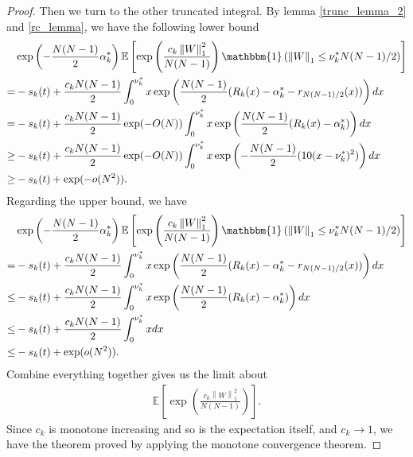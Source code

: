 \documentclass[10pt]{article}
\newcommand{\e}{\mathbb{E}}
\newcommand{\norm}[1]{\left\lVert#1\right\rVert}
\newenvironment{Proof of lemma}{\noindent{\bf Proof of Lemma}}{\hfill$\Box$\newline}
\newenvironment{Proof of claim}{\noindent{\bf Proof of claim}}{\hfill$\Box$\newline}
\newenvironment{Proof of theorem}{\noindent{\bf Proof of Theorem}}{\hfill\scriptsize{$\Box$}\newline}
\newenvironment{Proof of theorems}{\noindent{\bf Proof of Theorems}}{\hfill$\Box$\newline}
\newenvironment{Proof of proposition}{\noindent{\bf Proof of Proposition}}{\hfill$\Box$\newline}
\newenvironment{Proof of propositions}{\noindent{\bf Proof of Propositions}}{\hfill$\Box$\newline}
\newenvironment{Proof of exercise}{\noindent{\it Proof of Exercise:}}{\hfill$\Box$}
\numberwithin{equation}{section}
\begin{document}
\begin{proof}
Then we turn to the other truncated integral. By lemma \ref{trunc_lemma_2} and \ref{rc_lemma}, we have the following lower bound
\begin{align}
    &\exp\left(-\frac{N(N-1)}{2} \alpha_k^* \right)\e\left[ \exp \left(\frac{c_k\norm{W}^2_1}{N(N-1)}\right) \mathbbm{1}\left(\norm{W}_1 \leq \nu^*_k N(N-1)/2\right)\right] \nonumber \\
    =&-s_k(t) + \frac{c_kN(N-1)}{2}\int_{0}^{\nu^*_k}x \exp \left(\frac{N(N-1)}{2}(R_k(x)-\alpha_k^* -r_{N(N-1)/2}(x))\right)dx \nonumber \\
    =&-s_k(t) + \frac{c_kN(N-1)}{2}\exp(-O(N))\int_{0}^{\nu^*_k}x \exp \left(\frac{N(N-1)}{2}(R_k(x)-\alpha_k^*)\right)dx \nonumber \\
    \geq& -s_k(t) + \frac{c_kN(N-1)}{2}\exp(-O(N)) \int_{0}^{\nu^*_k}x \exp \left(-\frac{N(N-1)}{2}(10(x-\nu_k^*)^2)\right)dx \nonumber \\
    \geq& -s_k(t) + \exp(-o(N^2)).
\end{align}
Regarding the upper bound, we have
\begin{align}
    &\exp\left(-\frac{N(N-1)}{2} \alpha_k^* \right)\e\left[ \exp \left(\frac{c_k\norm{W}^2_1}{N(N-1)}\right) \mathbbm{1}\left(\norm{W}_1 \leq \nu^*_k N(N-1)/2\right)\right] \nonumber \\
    =&-s_k(t) + \frac{c_kN(N-1)}{2}\int_{0}^{\nu^*_k}x \exp \left(\frac{N(N-1)}{2}(R_k(x)-\alpha_k^* -r_{N(N-1)/2}(x))\right)dx \nonumber \\
    \leq& -s_k(t) + \frac{c_kN(N-1)}{2}\int_{0}^{\nu^*_k}x \exp \left(\frac{N(N-1)}{2}(R_k(x)-\alpha_k^*)\right)dx \nonumber \\
    \leq& -s_k(t) + \frac{c_kN(N-1)}{2}\int_{0}^{\nu^*_k}x dx \nonumber \\
    \leq& -s_k(t) + \exp(o(N^2)).
\end{align}
Combine everything together gives us the limit about
\begin{align}
    \e\left[ \exp \left(\frac{c_k\norm{W}^2_1}{N(N-1)}\right)\right].
\end{align}
Since $c_k$ is monotone increasing and so is the expectation itself, and $c_k \to 1$, we have the theorem proved by applying the monotone convergence theorem.
\end{proof}
\end{document}
